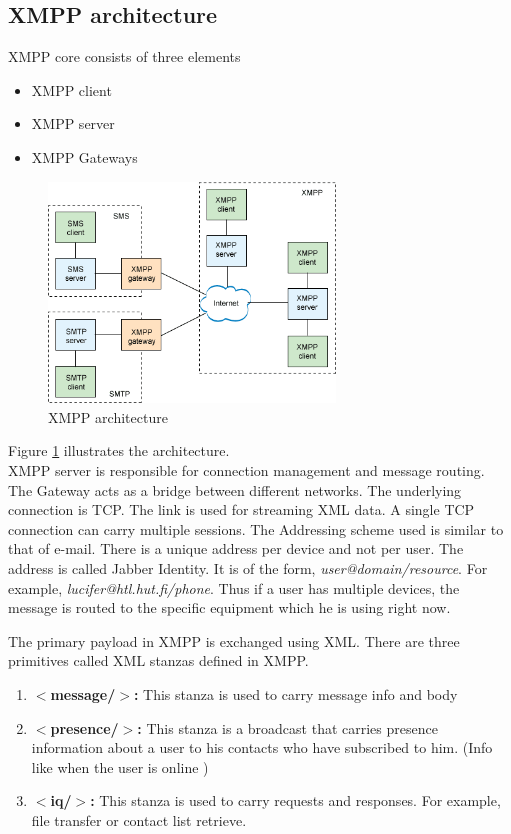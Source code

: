 \documentclass[11pt, conference, a4paper]{IEEEtran}
\begin{document}
\subsection{XMPP architecture}
XMPP core consists of three elements
\begin{itemize}
    \item XMPP client
    \item XMPP server
    \item XMPP Gateways
\end{itemize}
\begin{figure}[!htbp]
\begin{center}
  \includegraphics[width=3in]{xmpp_architecture.png}
\caption{XMPP architecture \cite{xmpp-arch}}
\label{fig: xmpp} 
\end{center}
\end{figure}
Figure \ref{fig: xmpp} illustrates the architecture.\\
XMPP server is responsible for connection management and message routing. The Gateway acts as a bridge between different networks. The underlying connection is TCP. The link is used for streaming XML data. A single TCP connection can carry multiple sessions. The Addressing scheme used is similar to that of e-mail. There is a unique address per device and not per user. The address is called Jabber Identity. It is of the form, \textit{user@domain/resource}. For example, \textit{lucifer@htl.hut.fi/phone}. Thus if a user has multiple devices, the message is routed to the specific equipment which he is using right now.
\par
The primary payload in XMPP is exchanged using XML. There are three primitives called XML stanzas defined in XMPP.
\begin{enumerate}
    \item \textbf{$<$message/$>$:} This stanza is used to carry message info and body
    \item \textbf{$<$presence/$>$:} This stanza is a broadcast that carries presence information about a user to his contacts who have subscribed to him. (Info like when the user is online )
    \item \textbf{$<$iq/$>$:} This stanza is used to carry requests and responses. For example, file transfer or contact list retrieve. 
\end{enumerate}
\end{document}
